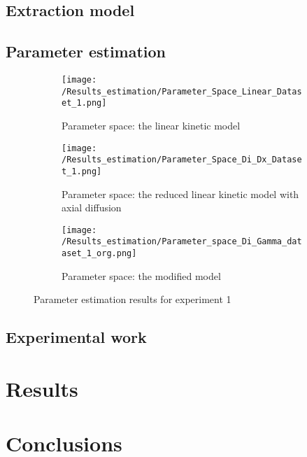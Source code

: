\documentclass[a4paper,fleqn]{cas-dc}
\begin{document}
\subsection{Extraction model} \label{CH: Extraction_model}


\subsection{Parameter estimation} \label{CH: Parameter_estimation}


\begin{figure*}[!b]
	\centering
	\begin{subfigure}{0.3\textwidth}
		\centering
		\texttt{[image: /Results\_estimation/Parameter\_Space\_Linear\_Dataset\_1.png]}
		\caption{Parameter space: the linear kinetic model}
		\label{fig: Fit_1_linear}
	\end{subfigure}
	\hfill
	\begin{subfigure}{0.3\textwidth}
		\centering
		\texttt{[image: /Results\_estimation/Parameter\_Space\_Di\_Dx\_Dataset\_1.png]}
		\caption{Parameter space: the reduced linear kinetic model with axial diffusion}
		\label{fig: Fit_1_Di_Dx}
	\end{subfigure}
	\hfill
	\begin{subfigure}{0.3\textwidth}
		\centering
		\texttt{[image: /Results\_estimation/Parameter\_space\_Di\_Gamma\_dataset\_1\_org.png]}
		\caption{Parameter space: the modified model}
		\label{fig: Fit_1_Di_Gamma}
	\end{subfigure}
	\caption{Parameter estimation results for experiment 1}
\end{figure*}

\subsection{Experimental work}


\section{Results}


\section{Conclusions} \label{CH: Conclusion}
\end{document}
